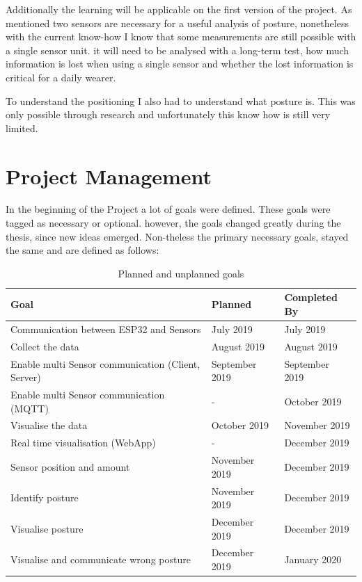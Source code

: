 Additionally the learning will be applicable on the first version of the project. As mentioned two sensors are necessary for a useful analysis of posture, nonetheless with the current know-how I know that some measurements are still possible with a single sensor unit. it will need to be analysed with a long-term test, how much information is lost when using a single sensor and whether the lost information is critical for a daily wearer.

To understand the positioning I also had to understand what posture is. This was only possible through research and unfortunately this know how is still very limited.

\section{Project Management}

In the beginning of the Project a lot of goals were defined. These goals were tagged as necessary or optional. however, the goals changed greatly during the thesis, since new ideas emerged. Non-theless the primary necessary goals, stayed the same and are defined as follows: 
\renewcommand{\thetable}{\arabic{table}}
\begin{center}
\begin{table}[h!]
\begin{tabular}{|p{9cm}|p{3cm}|p{3cm}|}
  \hline
 \textbf{Goal} &\textbf{ Planned  } &\textbf{ Completed By } \\ 
  \hline
 Communication between ESP32 and Sensors & July 2019 & July 2019   \\  
 \hline
 Collect the data  & August 2019  & August 2019   \\  
  \hline
 Enable multi Sensor communication (Client, Server) & September 2019 & September 2019   \\ 
  \hline
 Enable multi Sensor communication (MQTT) & - & October 2019   \\ 
  \hline
 Visualise the data & October 2019 & November 2019   \\  
  \hline
 Real time visualisation (WebApp) & - & December 2019   \\  
   \hline
 Sensor position and amount & November 2019 & December 2019   \\ 
  \hline
 Identify posture & November 2019 & December 2019   \\  
  \hline
 Visualise posture & December 2019 &  December 2019 \\    
   \hline
 Visualise and communicate wrong posture & December 2019& January 2020 \\    
  \hline
\end{tabular}
\caption{Planned and unplanned goals}
\label{table:1}
\end{table}
\end{center}

